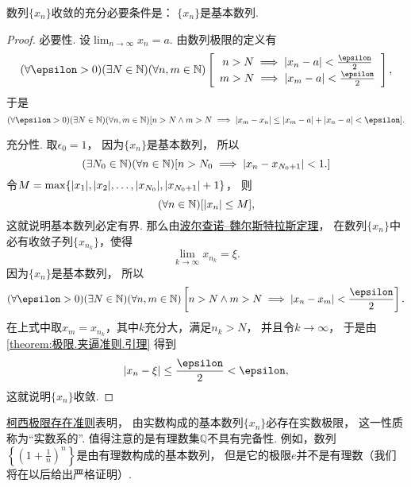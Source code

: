 \begin{theorem}[柯西极限存在准则]\label{theorem:极限.数列的柯西极限存在准则}
数列\(\{x_n\}\)收敛的充分必要条件是：
\(\{x_n\}\)是基本数列.
\begin{proof}
必要性.
设\(\lim_{n\to\infty} x_n = a\).
由数列极限的定义有\[
	(\forall\epsilon>0)
	(\exists N\in\mathbb{N})
	(\forall n,m\in\mathbb{N})
	\left[\def\arraystretch{1.2}
		\begin{array}{c}
			n > N \implies \abs{x_n - a} < \frac\epsilon2 \\
			m > N \implies \abs{x_m - a} < \frac\epsilon2
		\end{array}
	\right],
\]
于是\[
	(\forall\epsilon>0)
	(\exists N\in\mathbb{N})
	(\forall n,m\in\mathbb{N})
	[
		n > N \land m > N
		\implies
		\abs{x_m - x_n}
		\leq \abs{x_m - a} + \abs{x_n - a}
		< \epsilon
	].
\]

充分性.
取\(\epsilon_0 = 1\)，
因为\(\{x_n\}\)是基本数列，
所以\[
	(\exists N_0\in\mathbb{N})
	(\forall n\in\mathbb{N})
	[
		n > N_0
		\implies
		\abs{x_n - x_{N_0+1}} < 1.
	]
\]
令\(M = \max\{\abs{x_1},\abs{x_2},\dotsc,\abs{x_{N_0}},\abs{x_{N_0+1}}+1\}\)，
则\[
	(\forall n\in\mathbb{N})
	[\abs{x_n} \leq M],
\]
这就说明基本数列必定有界.
那么由\hyperref[theorem:极限.波尔查诺--魏尔斯特拉斯定理]{波尔查诺--魏尔斯特拉斯定理}，
在数列\(\{x_n\}\)中必有收敛子列\(\{x_{n_k}\}\)，使得\[
	\lim_{k\to\infty} x_{n_k} = \xi.
\]
因为\(\{x_n\}\)是基本数列，
所以\[
	(\forall\epsilon>0)
	(\exists N\in\mathbb{N})
	(\forall n,m\in\mathbb{N})
	\left[
		n > N \land m > N
		\implies
		\abs{x_n - x_m} < \frac\epsilon2
	\right].
\]
在上式中取\(x_m = x_{n_k}\)，其中\(k\)充分大，满足\(n_k > N\)，
并且令\(k\to\infty\)，
于是由\cref{theorem:极限.夹逼准则.引理} 得到\[
	\abs{x_n - \xi}
	\leq \frac\epsilon2
	< \epsilon,
\]
这就说明\(\{x_n\}\)收敛.
\end{proof}
\end{theorem}

\hyperref[theorem:极限.数列的柯西极限存在准则]{柯西极限存在准则}表明，
由实数构成的基本数列\(\{x_n\}\)必存在实数极限，
这一性质称为“实数系的”.
值得注意的是有理数集\(\mathbb{Q}\)不具有完备性.
例如，数列\(\left\{\left(1+\frac1n\right)^n\right\}\)是由有理数构成的基本数列，
但是它的极限\(e\)并不是有理数（我们将在以后给出严格证明）.%

